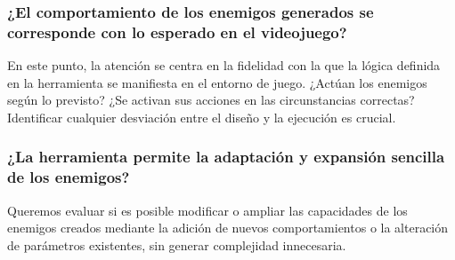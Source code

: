 \subsubsection{¿El comportamiento de los enemigos generados se corresponde con lo esperado en el videojuego?}
En este punto, la atención se centra en la fidelidad con la que la lógica definida en la herramienta se manifiesta en el entorno de juego. ¿Actúan los enemigos según lo previsto? ¿Se activan sus acciones en las circunstancias correctas? Identificar cualquier desviación entre el diseño y la ejecución es crucial.\\

\subsubsection{¿La herramienta permite la adaptación y expansión sencilla de los enemigos?}
Queremos evaluar si es posible modificar o ampliar las capacidades de los enemigos creados mediante la adición de nuevos comportamientos o la alteración de parámetros existentes, sin generar complejidad innecesaria.

